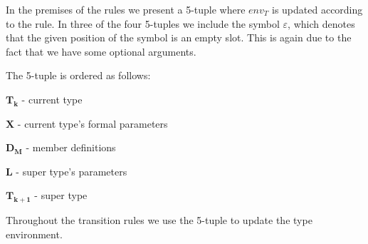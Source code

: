 In the premises of the rules we present a 5-tuple where $env_{T}$ is updated
according to the rule. In three of the four 5-tuples we include the symbol
$\varepsilon$, which denotes that the given position of the symbol is an empty
slot. This is again due to the fact that we have some optional arguments.

The 5-tuple is ordered as follows:

\begin{nlist}
\item $\mathbf{T_{k}}$ - current type
  \item $\mathbf{X}$ - current type's formal parameters
  \item $\mathbf{D_{M}}$ - member definitions
  \item $\mathbf{L}$ - super type's parameters
  \item $\mathbf{T_{k+1}}$ - super type
\end{nlist}

Throughout the transition rules we use the 5-tuple to update the type environment.
